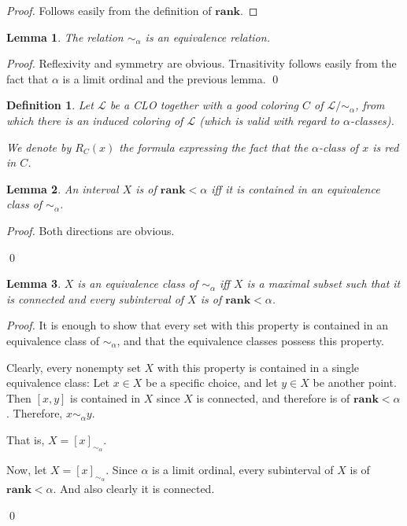 \documentclass{article}
\newtheorem{lemma}{Lemma}
\newtheorem{definition}{Definition}
\newcommand{\parens}[1]{\left( {#1} \right)}
\newcommand{\rankp}{\mathbf{rank}}
\newcommand{\LL}{\mathcal{L}}
\begin{document}
\begin{proof}
    Follows easily from the definition of $\rankp$.
\end{proof}

\begin{lemma}
    The relation $\sim_\alpha$ is an equivalence relation.
\end{lemma}

\begin{proof}
    Reflexivity and symmetry are obvious.
    Trnasitivity follows easily from the fact that $\alpha$ is a limit ordinal and the previous lemma.
    \qed
\end{proof}

\begin{definition}
    Let $\LL$ be a CLO together with a good coloring $C$ of $\LL / \sim_\alpha$, from which
    there is an induced coloring of $\LL$ (which is valid with regard to $\alpha$-classes).

    We denote by $R_C \parens{x}$ the formula expressing the fact that
    the $\alpha$-class of $x$ is red in $C$.
\end{definition}

\begin{lemma}
    An interval $X$ is of $\rankp < \alpha$ iff it is contained in an equivalence class of $\sim_\alpha$.
\end{lemma}

\begin{proof}
    Both directions are obvious. 

    \qed
\end{proof}

\begin{lemma}
    $X$ is an equivalence class of $\sim_\alpha$ iff $X$ is a maximal subset
    such that it is connected and every subinterval of $X$ is of $\rankp < \alpha$.
\end{lemma}

\begin{proof}
    It is enough to show that every set with this property is contained in an equivalence class of $\sim_\alpha$,
    and that the equivalence classes possess this property.

    Clearly, every nonempty set $X$ with this property is contained in a single equivalence class: 
    Let $x \in X$ be a specific choice, and let $y \in X$ be another point.
    Then $[x, y]$ is contained in $X$ since $X$ is connected, and therefore is of $\rankp < \alpha$.
    Therefore, $x \sim_\alpha y$.

    That is, $X = [x]_{\sim_\alpha}$.

    Now, let $X = [x]_{\sim_\alpha}$.
    Since $\alpha$ is a limit ordinal, every subinterval of $X$ is of $\rankp < \alpha$.
    And also clearly it is connected.

    \qed
\end{proof}
\end{document}
